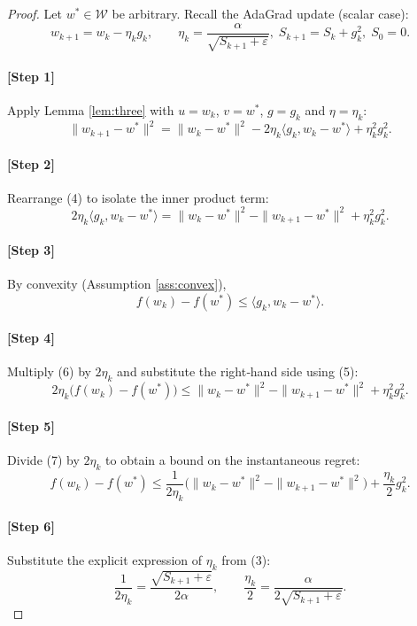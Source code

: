 \documentclass{article}
\begin{document}
\begin{proof}
Let $w^{*}\in\mathcal{W}$ be arbitrary.  
Recall the AdaGrad update (scalar case):
\[
w_{k+1}=w_{k}-\eta_{k}g_{k},\qquad 
\eta_{k}= \frac{\alpha}{\sqrt{S_{k+1}+\varepsilon}},\;
S_{k+1}=S_{k}+g_{k}^{2},\;S_{0}=0.
\tag{3}
\]

\paragraph{[Step 1]} Apply Lemma \ref{lem:three} with $u=w_{k}$, $v=w^{*}$, $g=g_{k}$ and $\eta=\eta_{k}$:
\[
\|w_{k+1}-w^{*}\|^{2}
  =\|w_{k}-w^{*}\|^{2}
   -2\eta_{k}\langle g_{k},w_{k}-w^{*}\rangle
   +\eta_{k}^{2}g_{k}^{2}.
\tag{4}
\]

\paragraph{[Step 2]} Rearrange (4) to isolate the inner product term:
\[
2\eta_{k}\langle g_{k},w_{k}-w^{*}\rangle
   =\|w_{k}-w^{*}\|^{2}
    -\|w_{k+1}-w^{*}\|^{2}
    +\eta_{k}^{2}g_{k}^{2}.
\tag{5}
\]

\paragraph{[Step 3]} By convexity (Assumption \ref{ass:convex}),
\[
f(w_{k})-f(w^{*})\le\langle g_{k}, w_{k}-w^{*}\rangle .
\tag{6}
\]

\paragraph{[Step 4]} Multiply (6) by $2\eta_{k}$ and substitute the right‑hand side using (5):
\[
2\eta_{k}\bigl(f(w_{k})-f(w^{*})\bigr)
   \le \|w_{k}-w^{*}\|^{2}
        -\|w_{k+1}-w^{*}\|^{2}
        +\eta_{k}^{2}g_{k}^{2}.
\tag{7}
\]

\paragraph{[Step 5]} Divide (7) by $2\eta_{k}$ to obtain a bound on the instantaneous regret:
\[
f(w_{k})-f(w^{*})
   \le \frac{1}{2\eta_{k}}\bigl(\|w_{k}-w^{*}\|^{2}
        -\|w_{k+1}-w^{*}\|^{2}\bigr)
        +\frac{\eta_{k}}{2}g_{k}^{2}.
\tag{8}
\]

\paragraph{[Step 6]} Substitute the explicit expression of $\eta_{k}$ from (3):
\[
\frac{1}{2\eta_{k}}=\frac{\sqrt{S_{k+1}+\varepsilon}}{2\alpha},
\qquad
\frac{\eta_{k}}{2}= \frac{\alpha}{2\sqrt{S_{k+1}+\varepsilon}}.
\tag{9}
\]


\end{proof}
\end{document}
